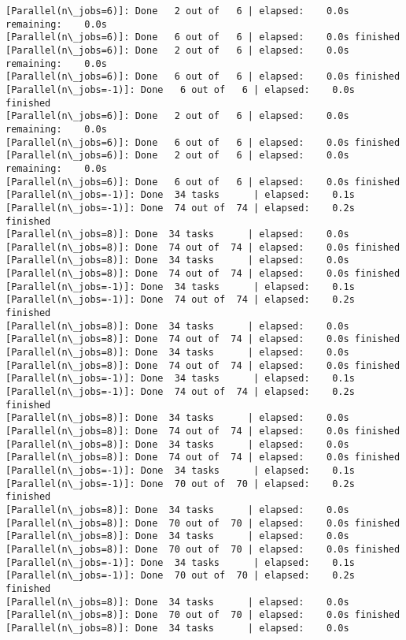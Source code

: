 \documentclass[11pt]{article}
\begin{document}
\begin{Verbatim}[commandchars=\\\{\}]
[Parallel(n\_jobs=6)]: Done   2 out of   6 | elapsed:    0.0s remaining:    0.0s
[Parallel(n\_jobs=6)]: Done   6 out of   6 | elapsed:    0.0s finished
[Parallel(n\_jobs=6)]: Done   2 out of   6 | elapsed:    0.0s remaining:    0.0s
[Parallel(n\_jobs=6)]: Done   6 out of   6 | elapsed:    0.0s finished
[Parallel(n\_jobs=-1)]: Done   6 out of   6 | elapsed:    0.0s finished
[Parallel(n\_jobs=6)]: Done   2 out of   6 | elapsed:    0.0s remaining:    0.0s
[Parallel(n\_jobs=6)]: Done   6 out of   6 | elapsed:    0.0s finished
[Parallel(n\_jobs=6)]: Done   2 out of   6 | elapsed:    0.0s remaining:    0.0s
[Parallel(n\_jobs=6)]: Done   6 out of   6 | elapsed:    0.0s finished
[Parallel(n\_jobs=-1)]: Done  34 tasks      | elapsed:    0.1s
[Parallel(n\_jobs=-1)]: Done  74 out of  74 | elapsed:    0.2s finished
[Parallel(n\_jobs=8)]: Done  34 tasks      | elapsed:    0.0s
[Parallel(n\_jobs=8)]: Done  74 out of  74 | elapsed:    0.0s finished
[Parallel(n\_jobs=8)]: Done  34 tasks      | elapsed:    0.0s
[Parallel(n\_jobs=8)]: Done  74 out of  74 | elapsed:    0.0s finished
[Parallel(n\_jobs=-1)]: Done  34 tasks      | elapsed:    0.1s
[Parallel(n\_jobs=-1)]: Done  74 out of  74 | elapsed:    0.2s finished
[Parallel(n\_jobs=8)]: Done  34 tasks      | elapsed:    0.0s
[Parallel(n\_jobs=8)]: Done  74 out of  74 | elapsed:    0.0s finished
[Parallel(n\_jobs=8)]: Done  34 tasks      | elapsed:    0.0s
[Parallel(n\_jobs=8)]: Done  74 out of  74 | elapsed:    0.0s finished
[Parallel(n\_jobs=-1)]: Done  34 tasks      | elapsed:    0.1s
[Parallel(n\_jobs=-1)]: Done  74 out of  74 | elapsed:    0.2s finished
[Parallel(n\_jobs=8)]: Done  34 tasks      | elapsed:    0.0s
[Parallel(n\_jobs=8)]: Done  74 out of  74 | elapsed:    0.0s finished
[Parallel(n\_jobs=8)]: Done  34 tasks      | elapsed:    0.0s
[Parallel(n\_jobs=8)]: Done  74 out of  74 | elapsed:    0.0s finished
[Parallel(n\_jobs=-1)]: Done  34 tasks      | elapsed:    0.1s
[Parallel(n\_jobs=-1)]: Done  70 out of  70 | elapsed:    0.2s finished
[Parallel(n\_jobs=8)]: Done  34 tasks      | elapsed:    0.0s
[Parallel(n\_jobs=8)]: Done  70 out of  70 | elapsed:    0.0s finished
[Parallel(n\_jobs=8)]: Done  34 tasks      | elapsed:    0.0s
[Parallel(n\_jobs=8)]: Done  70 out of  70 | elapsed:    0.0s finished
[Parallel(n\_jobs=-1)]: Done  34 tasks      | elapsed:    0.1s
[Parallel(n\_jobs=-1)]: Done  70 out of  70 | elapsed:    0.2s finished
[Parallel(n\_jobs=8)]: Done  34 tasks      | elapsed:    0.0s
[Parallel(n\_jobs=8)]: Done  70 out of  70 | elapsed:    0.0s finished
[Parallel(n\_jobs=8)]: Done  34 tasks      | elapsed:    0.0s

\end{Verbatim}
\end{document}
